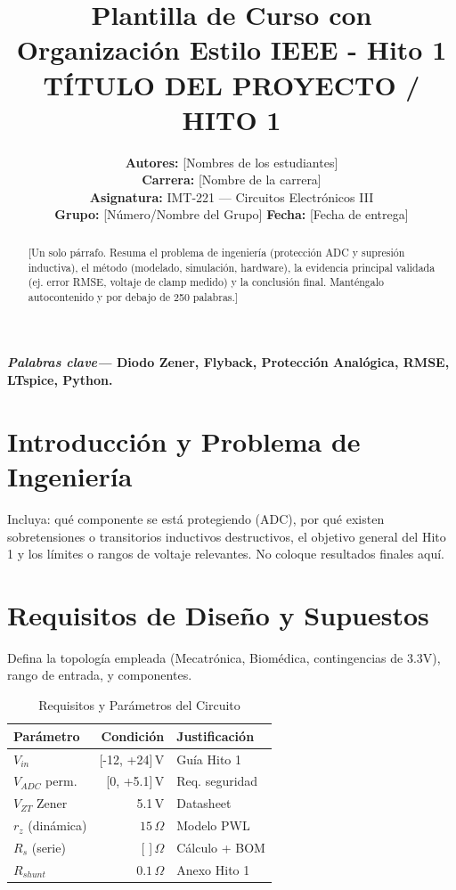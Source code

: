 \documentclass[10pt, a4paper, twocolumn]{article}
\title{\Large \textbf{Plantilla de Curso con Organización Estilo IEEE - Hito 1\\ [0.2cm] TÍTULO DEL PROYECTO / HITO 1}}
\author{
    \textbf{Autores:} [Nombres de los estudiantes] \\
    \textbf{Carrera:} [Nombre de la carrera] \\
    \textbf{Asignatura:} IMT-221 — Circuitos Electrónicos III \\
    \textbf{Grupo:} [Número/Nombre del Grupo] \quad \textbf{Fecha:} [Fecha de entrega]
}
\date{}
\begin{document}
\maketitle

\begin{abstract}
[Un solo párrafo. Resuma el problema de ingeniería (protección ADC y supresión inductiva), el método (modelado, simulación, hardware), la evidencia principal validada (ej. error RMSE, voltaje de clamp medido) y la conclusión final. Manténgalo autocontenido y por debajo de 250 palabras.]
\end{abstract}

\textbf{\textit{Palabras clave—} Diodo Zener, Flyback, Protección Analógica, RMSE, LTspice, Python.}

\section{Introducción y Problema de Ingeniería}
Incluya: qué componente se está protegiendo (ADC), por qué existen sobretensiones o transitorios inductivos destructivos, el objetivo general del Hito 1 y los límites o rangos de voltaje relevantes. No coloque resultados finales aquí.

\section{Requisitos de Diseño y Supuestos}
Defina la topología empleada (Mecatrónica, Biomédica, contingencias de 3.3V), rango de entrada, y componentes.

\begin{table}[h]
\centering
\caption{Requisitos y Parámetros del Circuito}
\begin{tabularx}{\linewidth}{X r >{\raggedright\arraybackslash}X}
\toprule
\textbf{Parámetro} & \textbf{Condición} & \textbf{Justificación} \\
\midrule
$V_{in}$ & [-12, +24]\,V & Guía Hito 1 \\
$V_{ADC}$ perm. & [0, +5.1]\,V & Req. seguridad \\
$V_{ZT}$ Zener & 5.1\,V & Datasheet \\
$r_z$ (dinámica) & $15\,\Omega$ & Modelo PWL \\
$R_s$ (serie) & [ ]\,$\Omega$ & Cálculo + BOM \\
$R_{shunt}$ & $0.1\,\Omega$ & Anexo Hito 1 \\
\bottomrule
\end{tabularx}
\end{table}
\end{document}
